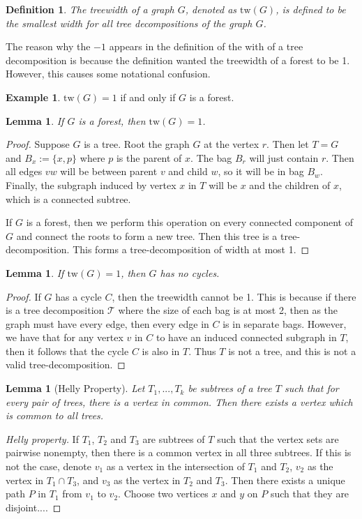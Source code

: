 \documentclass[]{article}
\newcommand{\tree}{\mathcal{T}}
\newcommand{\tw}{\text{tw}}
\newtheorem{lemma}[theorem]{Lemma}
\newtheorem{definition}[theorem]{Definition}
\theoremstyle{definition}
\newtheorem{example}[theorem]{Example}
\numberwithin{theorem}{section}
\numberwithin{equation}{section}
\begin{document}
\begin{definition}
	The treewidth of a graph $G$, denoted as $\tw(G)$, is defined to be the smallest width for all tree decompositions of the graph $G$.
\end{definition}
The reason why the $-1$ appears in the definition of the with of a tree decomposition is because the definition wanted the treewidth of a forest to be 1. However, this causes some notational confusion.
\begin{example}
	$\tw(G) = 1$ if and only if $G$ is a forest.
	\begin{lemma}
		If $G$ is a forest, then $\tw(G) = 1$.
	\end{lemma}
	\begin{proof}
		Suppose $G$ is a tree. Root the graph $G$ at the vertex $r$. Then let $T = G$ and $B_x:= \lbrace x, p \rbrace$ where $p$ is the parent of $x$. The bag $B_r$ will just contain $r$. Then all edges $vw$ will be between parent $v$ and child $w$, so it will be in bag $B_w$. Finally, the subgraph induced by vertex $x$ in $T$ will be $x$ and the children of $x$, which is a connected subtree.
		
		If $G$ is a forest, then we perform this operation on every connected component of $G$ and connect the roots to form a new tree. Then this tree is a tree-decomposition. This forms a tree-decomposition of width at most 1. 
	\end{proof}
	\begin{lemma}
		If $\tw(G) = 1$, then $G$ has no cycles.
	\end{lemma}
	\begin{proof}
		If $G$ has a cycle $C$, then the treewidth cannot be 1. This is because if there is a tree decomposition $\tree$ where the size of each bag is at most 2, then as the graph must have every edge, then every edge in $C$ is in separate bags. However, we have that for any vertex $v$ in $C$ to have an induced connected subgraph in $T$, then it follows that the cycle $C$ is also in $T$. Thus $T$ is not a tree, and this is not a valid tree-decomposition. 
	\end{proof}
\end{example}
\begin{lemma}[Helly Property]
	Let $T_1, ..., T_k$ be subtrees of a tree $T$ such that for every pair of trees, there is a vertex in common. Then there exists a vertex which is common to all trees.
\end{lemma}
\begin{proof}[Helly property]
	If $T_1$, $T_2$ and $T_3$ are subtrees of $T$ such that the vertex sets are pairwise nonempty, then there is a common vertex in all three subtrees. If this is not the case, denote $v_1$ as a vertex in the intersection of $T_1$ and $T_2$, $v_2$ as the vertex in $T_1 \cap T_3$, and $v_3$ as the vertex in $T_2$ and $T_3$. Then there exists a unique path $P$ in $T_1$ from $v_1$ to $v_2$. Choose two vertices $x$ and $y$ on $P$ such that they are disjoint....
\end{proof}
\end{document}
